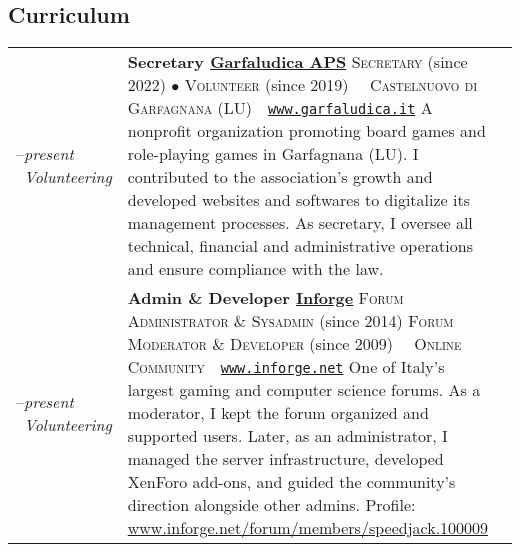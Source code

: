 \begin{paracol}{2}
	\section*{Curriculum}
	\begin{tabular}{>{\raggedleft\arraybackslash}p{}| p{} c}
		2019--\textit{present}\newline
		{\color{accentcolor}\scriptsize\faHeart~\textsl{Volunteering}}
		& \textbf{Secretary \faAt{} \href{https://www.garfaludica.it}{Garfaludica APS}}\newline
		\textsc{Secretary} {\color{black!70}\footnotesize(since 2022)} \(\bullet\) \textsc{Volunteer} {\color{black!70}\footnotesize(since 2019)}\newline
		{\footnotesize{\color{cvred}\faMapMarker}~~\textsc{Castelnuovo di Garfagnana (LU)}\quad{\color{cvred}\faGlobe}~~\href{https://www.garfaludica.it}{\color{black!70}\texttt{www.garfaludica.it}}}\newline
		{\color{black!70}\footnotesize A nonprofit organization
		promoting board games and role-playing games in Garfagnana
		(LU). I contributed to the association's growth and developed
		websites and softwares to digitalize its
		management processes. As secretary, I oversee all technical,
		financial and administrative operations and ensure compliance
		with the law.}\vspace{1em}
		& \raisebox{-0.8\height}{\href{https://www.garfaludica.it}{\texttt{[image: garfaludica]}}} \\
		2009--\textit{present}\newline
		{\color{accentcolor}\scriptsize\faHeart~\textsl{Volunteering}}
		& \textbf{Admin \& Developer \faAt{} \href{https://www.inforge.net}{Inforge}}\newline
		\textsc{Forum Administrator \& Sysadmin} {\color{black!70}\footnotesize(since 2014)}\newline
		\textsc{Forum Moderator \& Developer} {\color{black!70}\footnotesize(since 2009)}\newline
		{\footnotesize{\color{cvred}\faMapMarker}~~\textsc{Online Community}\quad{\color{cvred}\faGlobe}~~\href{https://www.inforge.net}{\color{black!70}\texttt{www.inforge.net}}}\newline
		{\color{black!70}\footnotesize One of Italy's largest gaming
		and computer science forums. As a moderator, I kept the forum
		organized and supported users. Later, as an administrator, I
		managed the server infrastructure, developed XenForo add-ons,
		and guided the community's direction alongside other admins.
		\newline{}Profile:
		\href{https://www.inforge.net/forum/members/speedjack.100009/}{www.inforge.net/forum/members/speedjack.100009}}
		& \raisebox{-0.8\height}{\href{https://www.inforge.net}{\texttt{[image: inforge]}}} \\
	\end{tabular}
	\vspace{1em}


\end{paracol}

